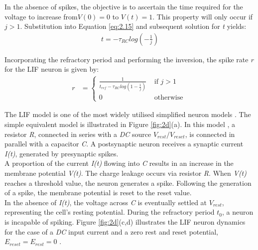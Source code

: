 \noindent In the absence of spikes, the objective is to ascertain the time required for the voltage to increase from$ V(0) = 0$ to $V(t) = 1$. This property will only occur if $j > 1$. Substitution into Equation \ref{eq:2.15} and subsequent solution for \textit{t} yields:
\begin{align}
t = - \tau_{RC} log \left( - \frac{1}{j} \right) \label{eq:2.16}
\end{align}

\noindent Incorporating the refractory period and performing the inversion, the spike rate \textit{r} for the LIF neuron is given by:
\begin{align}
r &= \begin{cases}
\frac{1}{t_{ref} - \tau_{RC} log \left( 1 - \frac{1}{j} \right)} & \text{ if } j > 1 \\ 
0 & \text{ otherwise }  
\end{cases} \label{eq:2.17}
\end{align}

\noindent The LIF model is one of the most widely utilised simplified neuron models \cite{lapique1907researches}. The simple equivalent model is illustrated in Figure \ref{fig:2d}(a). In this model \cite{stein1967frequency}, a resistor \textit{R}, connected in series with a \textit{DC} source $V_{rest}/V_{reset}$, is connected in parallel with a capacitor \textit{C}. A postsynaptic neuron receives a synaptic current \textit{I(t)}, generated by presynaptic spikes. \\

\noindent A proportion of the current \textit{I(t)} flowing into \textit{C} results in an increase in the membrane potential \textit{V(t)}. The charge leakage occurs via resistor \textit{R}. When \textit{V(t)} reaches a threshold value, the neuron generates a spike. Following the generation of a spike, the membrane potential is reset to the reset value. \\

\noindent In the absence of \textit{I(t)}, the voltage across \textit{C} is eventually settled at $V_{rest}$, representing the cell's resting potential. During the refractory period $t_0$, a neuron is incapable of spiking. Figure \ref{fig:2d}(c,d) illustrates the LIF neuron dynamics for the case of a \textit{DC} input current and a zero rest and reset potential, $E_{reset} = E_{rest} = 0$ \cite{tal1997computing}. \\

